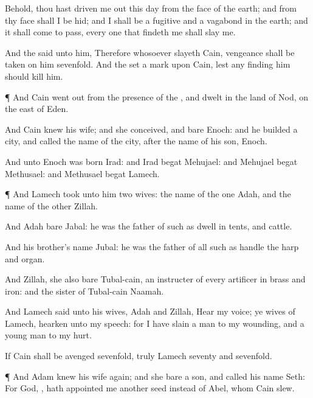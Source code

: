 {Behold, thou hast driven me
out this
day from the
face of the
earth; and
from thy
face shall I be
hid; and I shall be a
fugitive and a
vagabond in the
earth; and it shall come to
pass,
{} every one that findeth
me shall slay
me.

And the
{}
said unto him,
Therefore whosoever
slayeth
Cain, vengeance shall be
taken on him
sevenfold. And the
{}
set a
mark upon
Cain,
lest any
finding him should
kill him.


\par }{\PP {}¶ And
Cain went
out from the
presence of the
{}, and
dwelt in the
land of
Nod, on the
east of
Eden.

And
Cain
knew his
wife; and she
conceived, and
bare
Enoch: and he
builded a
city, and
called the
name of the
city, after the
name of his
son,
Enoch.

And unto
Enoch was
born
Irad: and
Irad
begat
Mehujael: and
Mehujael
begat
Methusael: and
Methusael
begat
Lamech.


\par }{\PP {}¶ And
Lamech
took unto him
two
wives: the
name of the
one
{}
Adah, and the
name of the
other
Zillah.

And
Adah
bare
Jabal: he was the
father of such as
dwell in
tents, and
{}
cattle.

And his
brother’s
name
{}
Jubal: he was the
father of all such as
handle the
harp and
organ.

And
Zillah, she also
bare
Tubal-cain, an
instructer of every
artificer in
brass and
iron: and the
sister of
Tubal-cain
{}
Naamah.


\par }{\PP {}And
Lamech
said unto his
wives,
Adah and
Zillah,
Hear my
voice; ye
wives of
Lamech,
hearken unto my
speech: for I have
slain a
man to my
wounding, and a young
man to my
hurt.

If
Cain shall be
avenged
sevenfold, truly
Lamech
seventy and
sevenfold.


\par }{\PP {}¶ And
Adam
knew his
wife
again; and she
bare a
son, and
called his
name
Seth: For
God,
{}, hath
appointed me
another
seed
instead of
Abel,
whom
Cain
slew.

}

